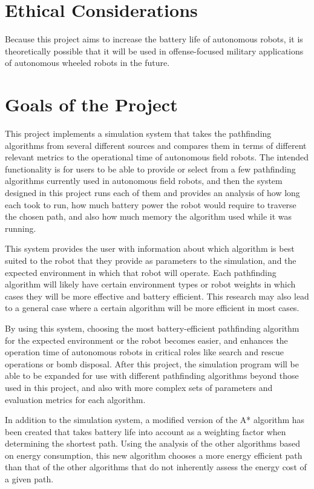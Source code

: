 \section{Ethical Considerations}
\label{sec:ethics}
Because this project aims to increase the battery life of autonomous robots, it is theoretically possible that it will be used in offense-focused military applications of autonomous wheeled robots in the future.

\section{Goals of the Project}
\label{sec:goals}
This project implements a simulation system that takes the pathfinding algorithms from several different sources and compares them in terms of different relevant metrics to the operational time of autonomous field robots. The intended functionality is for users to be able to provide or select from a few pathfinding algorithms currently used in autonomous field robots, and then the system designed in this project runs each of them and provides an analysis of how long each took to run, how much battery power the robot would require to traverse the chosen path, and also how much memory the algorithm used while it was running.
\par
This system provides the user with information about which algorithm is best suited to the robot that they provide as parameters to the simulation, and the expected environment in which that robot will operate. Each pathfinding algorithm will likely have certain environment types or robot weights in which cases they will be more effective and battery efficient. This research may also lead to a general case where a certain algorithm will be more efficient in most cases.
\par
By using this system, choosing the most battery-efficient pathfinding algorithm for the expected environment or the robot becomes easier, and enhances the operation time of autonomous robots in critical roles like search and rescue operations or bomb disposal. After this project, the simulation program will be able to be expanded for use with different pathfinding algorithms beyond those used in this project, and also with more complex sets of parameters and evaluation metrics for each algorithm.
\par
In addition to the simulation system, a modified version of the A* algorithm has been created that takes battery life into account as a weighting factor when determining the shortest path. Using the analysis of the other algorithms based on energy consumption, this new algorithm chooses a more energy efficient path than that of the other algorithms that do not inherently assess the energy cost of a given path.

